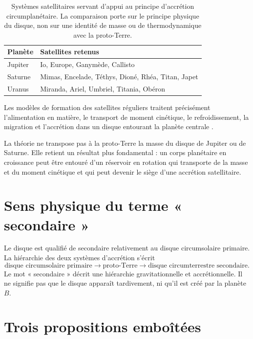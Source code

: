 \documentclass[11pt,a4paper,openany]{report}
\begin{document}
\begin{table}[htbp]
\centering
\caption{Systèmes satellitaires servant d'appui au principe d'accrétion circumplanétaire. La
comparaison porte sur le principe physique du disque, non sur une identité de masse ou de
thermodynamique avec la proto-Terre.}
\label{tab:systemes}
\begin{tabular}{ll}
\toprule
\textbf{Planète} & \textbf{Satellites retenus} \\
\midrule
Jupiter & Io, Europe, Ganymède, Callisto \\
Saturne & Mimas, Encelade, Téthys, Dioné, Rhéa, Titan, Japet \\
Uranus  & Miranda, Ariel, Umbriel, Titania, Obéron \\
\bottomrule
\end{tabular}
\end{table}

Les modèles de formation des satellites réguliers traitent précisément l'alimentation en
matière, le transport de moment cinétique, le refroidissement, la migration et l'accrétion dans
un disque entourant la planète centrale \cite{CanupWard2002,CanupWard2006,Nimmo2026}.

\begin{ideephys}
La théorie ne transpose pas à la proto-Terre la masse du disque de Jupiter ou de Saturne. Elle
retient un résultat plus fondamental : un corps planétaire en croissance peut être entouré d'un
réservoir en rotation qui transporte de la masse et du moment cinétique et qui peut devenir le
siège d'une accrétion satellitaire.
\end{ideephys}

\section{Sens physique du terme « secondaire »}

Le disque est qualifié de secondaire relativement au disque circumsolaire primaire. La
hiérarchie des deux systèmes d'accrétion s'écrit
\begin{equation}
\text{disque circumsolaire primaire}\longrightarrow\text{proto-Terre}\longrightarrow
\text{disque circumterrestre secondaire.}
\label{eq:hierarchie}
\end{equation}
Le mot « secondaire » décrit une hiérarchie gravitationnelle et accrétionnelle. Il ne signifie
pas que le disque apparaît tardivement, ni qu'il est créé par la planète $B$.


\section{Trois propositions emboîtées}
\end{document}
